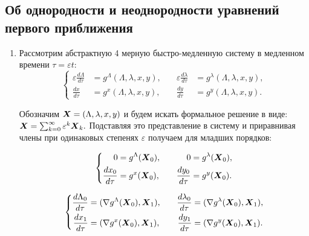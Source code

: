 \subsection{Об однородности и неоднородности уравнений первого приближения}
\begin{enumerate}

\item Рассмотрим абстрактную 4 мерную быстро-медленную систему в медленном времени $\tau = \varepsilon t$:
\begin{equation}
    \left\{
    \begin{aligned}
        \varepsilon \frac{d \Lambda}{d\tau} &= g^\Lambda(\Lambda,\lambda,x,y),
        &\quad
        \varepsilon \frac{d \lambda}{d\tau} &= g^\lambda(\Lambda,\lambda,x,y),\\
        \frac{d x}{d\tau} &= g^x(\Lambda,\lambda,x,y),
        &\quad
        \frac{d y}{d\tau} &= g^y(\Lambda,\lambda,x,y).
    \end{aligned}
    \right.
\end{equation}

Обозначим $\boldsymbol{X} = (\Lambda,\lambda,x,y)$ и будем искать формальное решение в виде:
$\boldsymbol{X} = \sum_{k=0}^\infty \varepsilon^k \boldsymbol{X}_k.$
Подставляя это представление в систему и приравнивая члены при одинаковых степенях $\varepsilon$ получаем для младших порядков:

\begin{equation}
    \left\{
    \begin{aligned}
        0 &= g^\Lambda(\boldsymbol{X}_0),
        &\quad
        0 &= g^\lambda(\boldsymbol{X}_0),\\
        \frac{d x_0}{d\tau} &= g^x(\boldsymbol{X}_0),
        &\quad
        \frac{d y_0}{d\tau} &= g^y(\boldsymbol{X}_0).
    \end{aligned}
    \right.
\end{equation}

\begin{equation}
    \left\{
    \begin{aligned}
        \frac{d \Lambda_0}{d\tau} &= (\nabla g^\Lambda(\boldsymbol{X}_0),\boldsymbol{X}_1),
        &\quad
        \frac{d \lambda_0}{d\tau} &= (\nabla g^\lambda(\boldsymbol{X}_0),\boldsymbol{X}_1),\\
        \frac{d x_1}{d\tau} &= (\nabla g^x(\boldsymbol{X}_0),\boldsymbol{X}_1),
        &\quad
        \frac{d y_1}{d\tau} &= (\nabla g^y(\boldsymbol{X}_0),\boldsymbol{X}_1).
    \end{aligned}
    \right.
    \label{1st_order}
\end{equation}


\end{enumerate}
